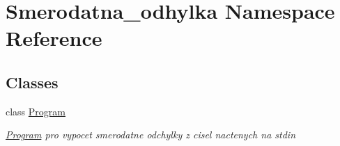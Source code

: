 \hypertarget{namespace_smerodatna__odhylka}{}\section{Smerodatna\+\_\+odhylka Namespace Reference}
\label{namespace_smerodatna__odhylka}
\subsection*{Classes}
\begin{DoxyCompactItemize}
\item 
class \mbox{\hyperlink{class_smerodatna__odhylka_1_1_program}{Program}}
\begin{DoxyCompactList}\small\item\em \mbox{\hyperlink{class_smerodatna__odhylka_1_1_program}{Program}} pro vypocet smerodatne odchylky z cisel nactenych na stdin \end{DoxyCompactList}\end{DoxyCompactItemize}
